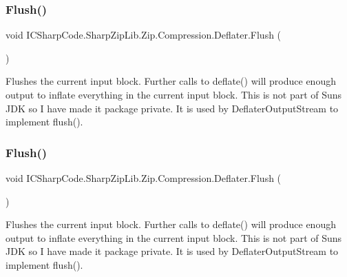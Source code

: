 \subsubsection{\texorpdfstring{Flush()}{Flush()}\hspace{0.1cm}{\footnotesize\ttfamily [1/2]}}
{\footnotesize\ttfamily void I\+C\+Sharp\+Code.\+Sharp\+Zip\+Lib.\+Zip.\+Compression.\+Deflater.\+Flush (\begin{DoxyParamCaption}{ }\end{DoxyParamCaption})\hspace{0.3cm}{\ttfamily [inline]}}



Flushes the current input block. Further calls to deflate() will produce enough output to inflate everything in the current input block. This is not part of Sun\textquotesingle{}s J\+DK so I have made it package private. It is used by Deflater\+Output\+Stream to implement flush(). 

\mbox{\label{class_i_c_sharp_code_1_1_sharp_zip_lib_1_1_zip_1_1_compression_1_1_deflater_a98a7b88b7209a07bcd5f69ab94863116}} 
\subsubsection{\texorpdfstring{Flush()}{Flush()}\hspace{0.1cm}{\footnotesize\ttfamily [2/2]}}
{\footnotesize\ttfamily void I\+C\+Sharp\+Code.\+Sharp\+Zip\+Lib.\+Zip.\+Compression.\+Deflater.\+Flush (\begin{DoxyParamCaption}{ }\end{DoxyParamCaption})\hspace{0.3cm}{\ttfamily [inline]}}



Flushes the current input block. Further calls to deflate() will produce enough output to inflate everything in the current input block. This is not part of Sun\textquotesingle{}s J\+DK so I have made it package private. It is used by Deflater\+Output\+Stream to implement flush(). 

